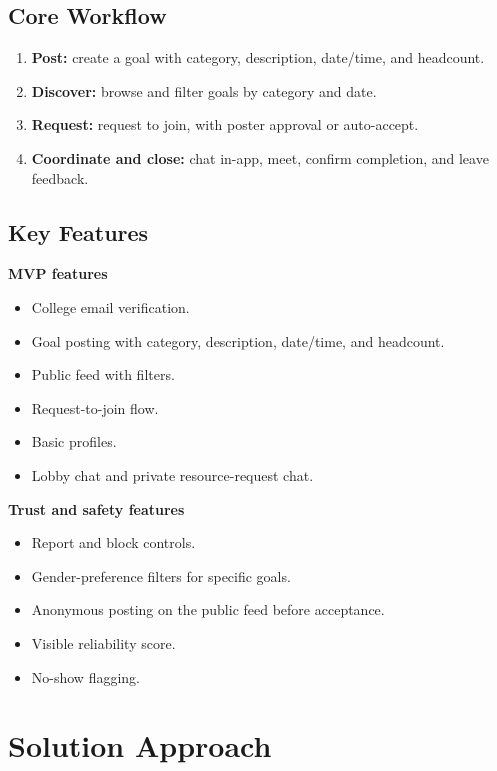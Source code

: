 \documentclass[12pt,a4paper]{article}
\begin{document}
\subsection{Core Workflow}

\begin{enumerate}[leftmargin=*]
  \item \textbf{Post:} create a goal with category, description, date/time, and headcount.
  \item \textbf{Discover:} browse and filter goals by category and date.
  \item \textbf{Request:} request to join, with poster approval or auto-accept.
  \item \textbf{Coordinate and close:} chat in-app, meet, confirm completion, and leave feedback.
\end{enumerate}

\subsection{Key Features}

\textbf{MVP features}
\begin{itemize}[leftmargin=*]
  \item College email verification.
  \item Goal posting with category, description, date/time, and headcount.
  \item Public feed with filters.
  \item Request-to-join flow.
  \item Basic profiles.
  \item Lobby chat and private resource-request chat.
\end{itemize}

\textbf{Trust and safety features}
\begin{itemize}[leftmargin=*]
  \item Report and block controls.
  \item Gender-preference filters for specific goals.
  \item Anonymous posting on the public feed before acceptance.
  \item Visible reliability score.
  \item No-show flagging.
\end{itemize}

\section{Solution Approach}
\end{document}
